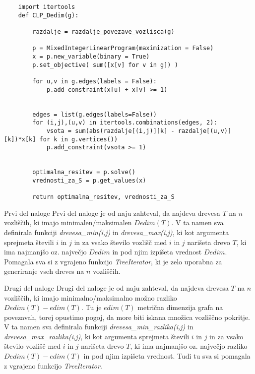 \documentclass[12pt,a4paper]{amsart}
\makeatletter
\renewcommand\subsection{\@startsection{subsection}{2}%
  \z@{.5\linespacing\@plus.7\linespacing}{.5\linespacing}%
  {\normalfont\scshape}}
\theoremstyle{plain} %
\makeatother
\begin{document}
\begin{small}
    \begin{lstlisting}
    import itertools  
    def CLP_Dedim(g):

        razdalje = razdalje_povezave_vozlisca(g)

        p = MixedIntegerLinearProgram(maximization = False)
        x = p.new_variable(binary = True)
        p.set_objective( sum([x[v] for v in g]) )

        for u,v in g.edges(labels = False):
            p.add_constraint(x[u] + x[v] >= 1)


        edges = list(g.edges(labels=False))
        for (i,j),(u,v) in itertools.combinations(edges, 2):
            vsota = sum(abs(razdalje[(i,j)][k] - razdalje[(u,v)][k])*x[k] for k in g.vertices())
            p.add_constraint(vsota >= 1)


        optimalna_resitev = p.solve()
        vrednosti_za_S = p.get_values(x)

        return optimalna_resitev, vrednosti_za_S

    \end{lstlisting}
\end{small}

\bigskip

\subsection{Prvi del naloge}
Prvi del naloge je od naju zahteval, da najdeva drevesa $T$ na $n$ vozliščih, ki imajo minimalen/maksimalen $Dedim(T)$. V ta namen sva definirala funkciji \emph{drevesa\_min(i,j)} in \emph{drevesa\_max(i,j)}, 
ki kot argumenta sprejmeta števili $i$ in $j$ in za vsako število vozlišč med $i$ in $j$ narišeta drevo $T$, ki ima najmanjšo oz. največjo $Dedim$ in pod njim izpišeta vrednost $Dedim$. Pomagala sva si z vgrajeno funkcijo \emph{TreeIterator}, ki je zelo uporabna za generiranje vseh dreves na $n$ vozliščih.

\subsection{Drugi del naloge}
Drugi del naloge je od naju zahteval, da najdeva drevesa $T$ na $n$ vozliščih, ki imajo minimalno/maksimalno možno razliko $Dedim(T) - edim(T)$. Tu je $edim(T)$ metrična dimenzija grafa na povezavah, torej opustimo pogoj, da more biti iskana množica vozliščno pokritje. V ta namen sva definirala funkciji \emph{drevesa\_min\_razlika(i,j)} in \emph{drevesa\_max\_razlika(i,j)}, 
ki kot argumenta sprejmeta števili $i$ in $j$ in za vsako število vozlišč med $i$ in $j$ narišeta drevo $T$, ki ima najmanjšo oz. največjo razliko $Dedim(T) - edim(T)$ in pod njim izpišeta vrednost. Tudi tu sva si pomagala z vgrajeno funkcijo \emph{TreeIterator}.
\end{document}
